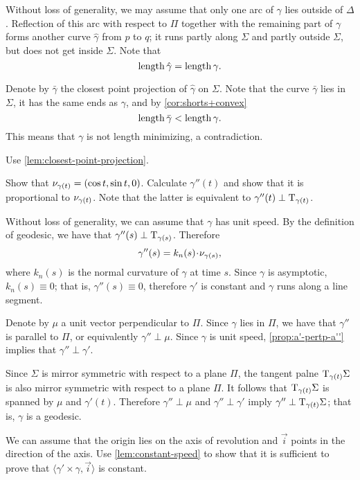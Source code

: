 Without loss of generality, we may assume that only one arc of $\gamma$ lies outside of $\Delta$.
Reflection of this arc  with respect to $\Pi$ together with the remaining part of $\gamma$ forms another curve $\hat\gamma$ from $p$ to $q$;
it runs partly along $\Sigma$ 
and partly outside $\Sigma$,
but does not get inside $\Sigma$.
Note that
\[\mathop{\rm length}\nolimits\hat\gamma=\mathop{\rm length}\nolimits\gamma.\]


Denote by $\bar\gamma$ the closest point projection of $\hat\gamma$ on $\Sigma$.
Note that the curve $\bar\gamma$ lies in $\Sigma$, 
it has the same ends as $\gamma$,
and by \ref{cor:shorts+convex}
\[\mathop{\rm length}\nolimits\bar\gamma<\mathop{\rm length}\nolimits\gamma.\]
This means that $\gamma$ is not length minimizing, 
a contradiction.

 Use \ref{lem:closest-point-projection}.

\setcounter{eqtn}{0}

Show that $\nu_{\gamma(t)}=(\cos t,\sin t, 0)$.
Calculate $\gamma''(t)$ and show that it is proportional to $\nu_{\gamma(t)}$.
Note that the latter is equivalent to $\gamma''(t)\perp\mathrm{T}_{\gamma(t)}$.

 Without loss of generality, we can assume that $\gamma$ has unit speed.
By the definition of geodesic, we have that $\gamma''(s)\perp\mathrm{T}_{\gamma(s)}$. 
Therefore 
\[\gamma''(s)=k_n(s)\cdot\Norm_{\gamma(s)},\]
where $k_n(s)$ is the normal curvature of $\gamma$ at time $s$.
Since $\gamma$ is asymptotic, $k_n(s)\equiv 0$;
that is, $\gamma''(s)\equiv 0$, therefore $\gamma'$ is constant and $\gamma$ runs along a line segment.

Denote by $\mu$ a unit vector perpendicular to $\Pi$.
Since $\gamma$ lies in $\Pi$, we have that $\gamma''$ is parallel to $\Pi$, or equivalently $\gamma''\perp \mu$.
Since $\gamma$ is unit speed, \ref{prop:a'-pertp-a''} implies that $\gamma''\perp\gamma'$.

Since $\Sigma$ is mirror symmetric with respect to  a plane $\Pi$,
the tangent palne $\mathrm{T}_{\gamma(t)}\Sigma$ is also mirror symmetric with respect to  a plane $\Pi$.
It follows that $\mathrm{T}_{\gamma(t)}\Sigma$ is spanned by $\mu$ and $\gamma'(t)$.
Therefore $\gamma''\perp \mu$ and $\gamma''\perp\gamma'$ imply $\gamma''\perp\mathrm{T}_{\gamma(t)}\Sigma$;
that is, $\gamma$ is a geodesic.

We can assume that the origin lies on the axis of revolution and $\vec i$ points in the direction of the axis.
Use \ref{lem:constant-speed} to show that it is sufficient to prove that 
$\langle\gamma'\times \gamma,\vec i\rangle$
is constant.

